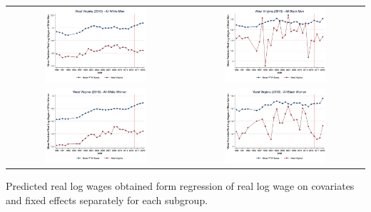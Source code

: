 \documentclass[11pt]{article}
\begin{document}
{\pagebreak
\begin{landscape}
\begin{table}[h!]
    \centering
    \label{fig:pta_wv}
    \begin{tabular}{c c}
          \includegraphics[width = 0.6\textwidth, keepaspectratio]{figures/pta/fin_wm_wv.png} & \includegraphics[width = 0.6\textwidth, keepaspectratio]{figures/pta/fin_bm_wv.png} \\
          \includegraphics[width = 0.6\textwidth, keepaspectratio]{figures/pta/fin_wf_wv.png} & \includegraphics[width = 0.6\textwidth, keepaspectratio]{figures/pta/fin_bf_wv.png}
    \end{tabular}
\end{table}
\footnotesize{Predicted real log wages obtained form regression of real log wage on covariates and fixed effects separately for each subgroup.}
\end{landscape}

}
\end{document}
